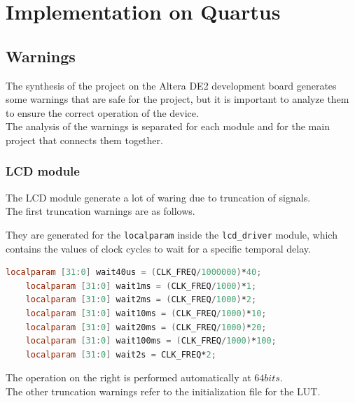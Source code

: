 \clearpage
\section{Implementation on Quartus}
\label{sec:implementation_on_quartus}

\subsection{Warnings}
The synthesis of the project on the Altera DE2 development board generates some warnings that are safe for the project, but it is important to analyze them to ensure the correct operation of the device. \\
The analysis of the warnings is separated for each module and for the main project that connects them together.

\subsubsection{LCD module}
The LCD module generate a lot of waring due to truncation of signals. \\
The first truncation warnings are as follows.

\begin{warningbox}[Warning]
     \newline
\end{warningbox}

\noindent
They are generated for the \texttt{localparam} inside the \texttt{lcd\_driver} module, which contains the values of clock cycles to wait for a specific temporal delay.

\begin{lstlisting}[language=Verilog]
    localparam [31:0] wait40us = (CLK_FREQ/1000000)*40; 
    localparam [31:0] wait1ms = (CLK_FREQ/1000)*1; 
    localparam [31:0] wait2ms = (CLK_FREQ/1000)*2; 
    localparam [31:0] wait10ms = (CLK_FREQ/1000)*10; 
    localparam [31:0] wait20ms = (CLK_FREQ/1000)*20; 
    localparam [31:0] wait100ms = (CLK_FREQ/1000)*100; 
    localparam [31:0] wait2s = CLK_FREQ*2; 
\end{lstlisting}

\noindent
The operation on the right is performed automatically at \(64 bits\). \\
The other truncation warnings refer to the initialization file for the LUT.

